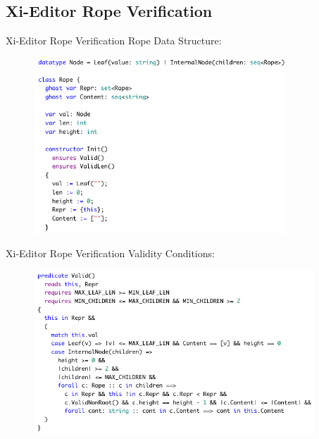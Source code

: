 \documentclass{beamer}
\begin{document}
\subsection{Xi-Editor Rope Verification}

\begin{frame}{Xi-Editor Rope Verification}
  Rope Data Structure:

  \begin{figure}
      \includegraphics[width=9.5cm]{images/xi-rope-datastructure.png}
  \end{figure}
\end{frame}

\begin{frame}{Xi-Editor Rope Verification}
  Validity Conditions:

  \begin{figure}
      \includegraphics[width=10.5cm]{images/xi-rope-valid.png}
  \end{figure}

\end{frame}
\end{document}
